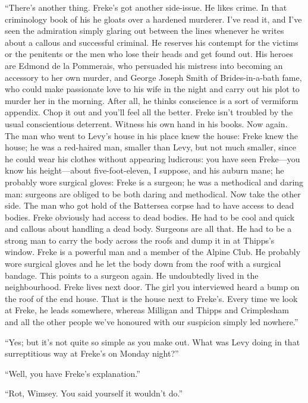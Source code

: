 \enquote{There’s another thing. Freke’s got another side-issue. He likes crime. In that criminology book of his he gloats over a hardened murderer. I’ve read it, and I’ve seen the admiration simply glaring out between the lines whenever he writes about a callous and successful criminal. He reserves his contempt for the victims or the penitents or the men who lose their heads and get found out. His heroes are Edmond de la Pommerais, who persuaded his mistress into becoming an accessory to her own murder, and George Joseph Smith of Brides-in-a-bath fame, who could make passionate love to his wife in the night and carry out his plot to murder her in the morning. After all, he thinks conscience is a sort of vermiform appendix. Chop it out and you’ll feel all the better. Freke isn’t troubled by the usual conscientious deterrent. Witness his own hand in his books. Now again. The man who went to Levy’s house in his place knew the house: Freke knew the house; he was a red-haired man, smaller than Levy, but not much smaller, since he could wear his clothes without appearing ludicrous: you have seen Freke\allowbreak---\allowbreak you know his height\allowbreak---\allowbreak about five-foot-eleven, I suppose, and his auburn mane; he probably wore surgical gloves: Freke is a surgeon; he was a methodical and daring man: surgeons are obliged to be both daring and methodical. Now take the other side. The man who got hold of the Battersea corpse had to have access to dead bodies. Freke obviously had access to dead bodies. He had to be cool and quick and callous about handling a dead body. Surgeons are all that. He had to be a strong man to carry the body across the roofs and dump it in at Thipps’s window. Freke is a powerful man and a member of the Alpine Club. He probably wore surgical gloves and he let the body down from the roof with a surgical bandage. This points to a surgeon again. He undoubtedly lived in the neighbourhood. Freke lives next door. The girl you interviewed heard a bump on the roof of the end house. That is the house next to Freke’s. Every time we look at Freke, he leads somewhere, whereas Milligan and Thipps and Crimplesham and all the other people we’ve honoured with our suspicion simply led nowhere.}

\enquote{Yes; but it’s not quite so simple as you make out. What was Levy doing in that surreptitious way at Freke’s on Monday night?}

\enquote{Well, you have Freke’s explanation.}

\enquote{Rot, Wimsey. You said yourself it wouldn’t do.}

